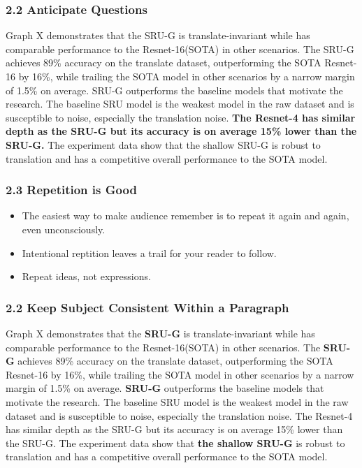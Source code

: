 \documentclass{beamer}
\begin{document}
    \begin{frame}
        \frametitle{2.2 Anticipate Questions}
        Graph X demonstrates that the SRU-G is translate-invariant while has comparable performance to the Resnet-16(SOTA) in other scenarios.
        The SRU-G achieves 89\% accuracy on the translate dataset, outperforming the SOTA Resnet-16 by 16\%, while trailing the SOTA model in other scenarios by a narrow margin of 1.5\% on average.
        SRU-G outperforms the baseline models that motivate the research. The baseline SRU model is the weakest model in the raw dataset and is susceptible to noise, especially the translation noise. \textbf{The Resnet-4 has similar depth as the SRU-G but its accuracy is on average 15\% lower than the SRU-G.}
        The experiment data show that the shallow SRU-G is robust to translation and has a competitive overall performance to the SOTA model.
    \end{frame}
  

\begin{frame}
    \frametitle{2.3 Repetition is Good}
    \begin{itemize}[<+->]
        \item The easiest way to make audience remember is to repeat it again and again, even unconsciously.
        \item Intentional reptition leaves a trail for your reader to follow.
        \item Repeat ideas, not expressions.
    \end{itemize}
\end{frame}

\begin{frame}
  \frametitle{2.2 Keep Subject Consistent Within a Paragraph}
  Graph X demonstrates that the \textbf{SRU-G} is translate-invariant while has comparable performance to the Resnet-16(SOTA) in other scenarios.
  The \textbf{SRU-G} achieves 89\% accuracy on the translate dataset, outperforming the SOTA Resnet-16 by 16\%, while trailing the SOTA model in other scenarios by a narrow margin of 1.5\% on average.
  \textbf{SRU-G} outperforms the baseline models that motivate the research. The baseline SRU model is the weakest model in the raw dataset and is susceptible to noise, especially the translation noise. The Resnet-4 has similar depth as the SRU-G but its accuracy is on average 15\% lower than the SRU-G.
  The experiment data show that \textbf{the shallow SRU-G} is robust to translation and has a competitive overall performance to the SOTA model.
\end{frame}
\end{document}
